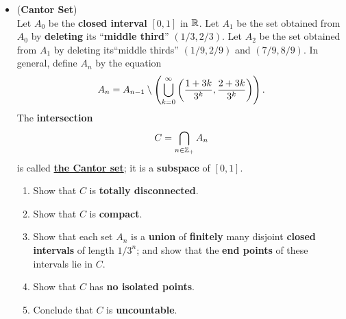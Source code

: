 \documentclass[11pt]{article}
\begin{document}
\begin{itemize}
\item \begin{exercise} (\textbf{Cantor Set}) \citep{munkres2000topology}\\
Let $A_0$ be the \textbf{closed interval} $[0, 1]$ in ${\mathbb R}$. Let $A_1$ be the set obtained from $A_0$ by \textbf{deleting} its ``\textbf{middle third}” $(1/3, 2/3)$. Let $A_2$ be the set obtained from $A_1$ by deleting its``middle thirds” $(1/9, 2/9)$ and $(7/9, 8/9)$. In general, define $A_n$ by the equation
\begin{align*}
A_n = A_{n-1} \setminus \left(\bigcup_{k=0}^{\infty}\left(\frac{1 + 3k}{3^k}, \frac{2 + 3k}{3^k}\right)\right).
\end{align*}
The \textbf{intersection}
\begin{align*}
C = \bigcap_{n \in {\mathbb Z}_{+}}A_n
\end{align*}
is called \underline{\textbf{the Cantor set}}; it is a \textbf{subspace} of $[0, 1]$.
\begin{enumerate}
\item Show that $C$ is \textbf{totally disconnected}.
\item Show that $C$ is \textbf{compact}.
\item Show that each set $A_n$ is a \textbf{union} of \textbf{finitely} many disjoint \textbf{closed intervals} of
length $1/3^n$; and show that the \textbf{end points} of these intervals lie in $C$.
\item Show that $C$ has \textbf{no isolated points}.
\item Conclude that $C$ is \textbf{uncountable}.
\end{enumerate}
\end{exercise}
\end{itemize}
\end{document}
